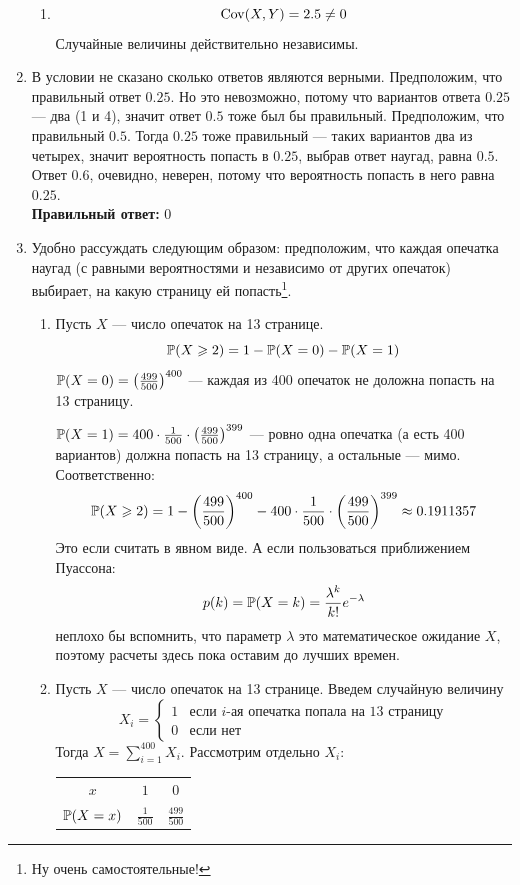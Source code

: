 \begin{enumerate}
\begin{enumerate}
\item
\[
\Cov(X, Y) = 2.5 \ne 0
\]
Случайные величины действительно независимы.
\end{enumerate}

\item
В условии не сказано сколько ответов являются верными. Предположим, что правильный
ответ $0.25$. Но это невозможно, потому что вариантов ответа $0.25$ — два (1 и 4),
значит ответ $0.5$ тоже был бы правильный. Предположим, что правильный $0.5$.
Тогда $0.25$ тоже правильный — таких вариантов два из четырех, значит вероятность
попасть в $0.25$, выбрав ответ наугад, равна $0.5$. Ответ $0.6$, очевидно, неверен,
потому что вероятность попасть в него равна $0.25$. \\
\textbf{Правильный ответ:} $0$

\item
Удобно рассуждать следующим образом: предположим, что каждая опечатка наугад
(с равными вероятностями и независимо от других опечаток) выбирает, на какую
страницу ей попасть\footnote[1]{Ну очень самостоятельные!}.

\begin{enumerate}
\item Пусть $X$ — число опечаток на 13 странице.
\[
\P(X \geqslant 2) = 1 - \P(X=0) - \P(X=1)
\]
$\P(X=0) = \left( \frac{499}{500} \right)^{400}$ — каждая из 400 опечаток
не доложна попасть на 13 страницу.

$\P(X=1) = 400\cdot\frac{1}{500}\cdot\left( \frac{499}{500} \right)^{399}$ —
ровно одна опечатка (а есть 400 вариантов) должна попасть на 13 страницу,
а остальные — мимо. Соответственно:
\[
\P(X \geqslant 2) = 1 - \left( \frac{499}{500} \right)^{400} -
400\cdot\frac{1}{500}\cdot\left( \frac{499}{500} \right)^{399} \approx 0.1911357
\]
Это если считать в явном виде. А если пользоваться приближением Пуассона:
\[
p(k) = \P(X = k) = \frac{\lambda^k}{k!}e^{-\lambda}
\]
неплохо бы вспомнить, что параметр $\lambda$ это математическое ожидание $X$,
поэтому расчеты здесь пока оставим до лучших времен.

\item Пусть $X$ — число опечаток на 13 странице. Введем случайную величину
\[
X_i =
\begin{cases}
1 & \text{если } i\text{-ая опечатка попала на 13 страницу}\\
0 & \text{если нет}
\end{cases}
\]
Тогда $X = \sum\limits_{i=1}^{400}X_i$. Рассмотрим отдельно $X_i$:

\begin{center}
\begin{tabular}{@{}ccc@{}}
\toprule
$x$         & $1$             & $0$               \\
$\P(X=x)$ & $\frac{1}{500}$ & $\frac{499}{500}$ \\ \bottomrule
\end{tabular}
\end{center}


\end{enumerate}
\end{enumerate}

